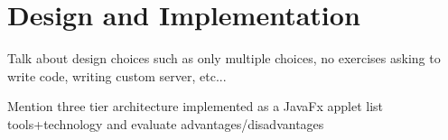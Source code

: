 \chapter{Design and Implementation}
\label{chap:implementation}
Talk about design choices such as only multiple choices, no exercises asking to write code, writing custom server, etc...

Mention three tier architecture
implemented as a JavaFx applet
list tools+technology and evaluate advantages/disadvantages